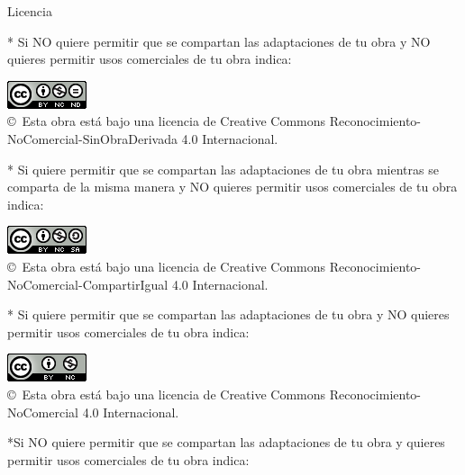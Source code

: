 \newpage

\begin{huge}
Licencia
\end{huge}

\bigskip
* Si NO quiere permitir que se compartan las adaptaciones de tu obra
y NO quieres permitir usos comerciales de tu obra indica:

\begin{center}
\includegraphics[scale=1.5]{Imagenes/Licencias/by-nc-nd_88x31}\\[10mm]
{\Large \copyright~Esta obra está bajo una licencia de Creative Commons Reconocimiento-NoComercial-SinObraDerivada 4.0 Internacional.
}
\end{center}


\bigskip
* Si quiere permitir que se compartan las adaptaciones de tu obra mientras se comparta de la misma manera
y NO quieres permitir usos comerciales de tu obra indica:

\begin{center}
\includegraphics[scale=1.5]{Imagenes/Licencias/by-nc-sa_88x31}\\[10mm]
{\Large \copyright~Esta obra está bajo una licencia de Creative Commons Reconocimiento-NoComercial-CompartirIgual 4.0 Internacional.
}
\end{center}



\bigskip
* Si quiere permitir que se compartan las adaptaciones de tu obra
y NO quieres permitir usos comerciales de tu obra indica:

\begin{center}
\includegraphics[scale=1.5]{Imagenes/Licencias/by-nc_88x31}\\[10mm]
{\Large \copyright~Esta obra está bajo una licencia de Creative Commons Reconocimiento-NoComercial 4.0 Internacional.
}
\end{center}

\newpage

\bigskip
*Si NO quiere permitir que se compartan las adaptaciones de tu obra
y quieres permitir usos comerciales de tu obra indica:

